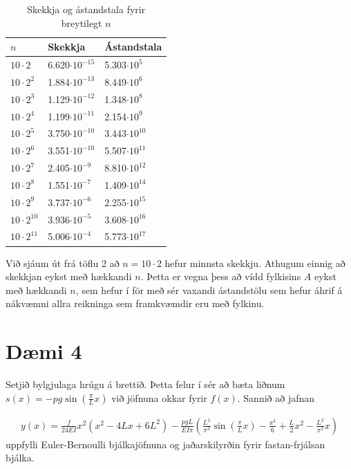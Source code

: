 \documentclass[11pt]{article}
\begin{document}
{\begin{table}[h!]
\caption{Skekkja og ástandstala fyrir breytilegt $n$}
\begin{center}
\begin{tabular}{l | l| l}
$n$ & Skekkja & Ástandstala\\
\hline
$10\cdot 2$			& 6.620$\cdot 10^{-15}$	& 5.303$\cdot 10^{5}$	\\
$10\cdot 2^2$		& 1.884$\cdot 10^{-13}$	& 8.449$\cdot 10^{6}$	\\
$10\cdot 2^3$		& 1.129$\cdot 10^{-12}$	& 1.348$\cdot 10^{8}$	\\
$10\cdot 2^4$		& 1.199$\cdot 10^{-11}$	& 2.154$\cdot 10^{9}$	\\
$10\cdot 2^5$		& 3.750$\cdot 10^{-10}$	& 3.443$\cdot 10^{10}$	\\
$10\cdot 2^6$		& 3.551$\cdot 10^{-10}$	& 5.507$\cdot 10^{11}$ \\
$10\cdot 2^7$		& 2.405$\cdot 10^{-9}$	& 8.810$\cdot 10^{12}$ \\    
$10\cdot 2^8$		& 1.551$\cdot 10^{-7}$	& 1.409$\cdot 10^{14}$	\\
$10\cdot 2^9$		& 3.737$\cdot 10^{-6}$	& 2.255$\cdot 10^{15}$	\\
$10\cdot 2^{10}$	& 3.936$\cdot 10^{-5}$	& 3.608$\cdot 10^{16}$	\\
$10\cdot 2^{11}$	& 5.006$\cdot 10^{-4}$	& 5.773$\cdot 10^{17}$	\\
\end{tabular}
\end{center}
\end{table}

Við sjáum út frá töflu 2 að $n=10\cdot 2$ hefur minnsta skekkju. Athugum einnig að skekkjan eykst með hækkandi $n$. Þetta er vegna þess að vídd fylkisins $A$ eykst með hækkandi $n$, sem hefur í för með sér vaxandi ástandstölu sem hefur áhrif á nákvæmni allra reikninga sem framkvæmdir eru með fylkinu.





\newpage
\section*{Dæmi 4}

Setjið bylgjulaga hrúgu á brettið. Þetta felur í sér að bæta liðnum $s(x) = -pg\sin\left(\frac{\pi}{L}x\right)$ við jöfnuna okkar fyrir $f(x)$. Sannið að jafnan

\begin{align*}
y(x)=\frac{f}{24EI}x^2(x^2-4Lx+6L^2)-\frac{pgL}{EI\pi}\left(\frac{L^3}{\pi ^3}\sin\left(\frac{\pi}{L}x\right)-\frac{x^3}{6}+\frac{L}{2}x^2-\frac{L^2}{\pi^2}x\right)
\end{align*}
uppfylli Euler-Bernoulli bjálkajöfnuna og jaðarskilyrðin fyrir fastan-frjálsan bjálka.
}
\end{document}
